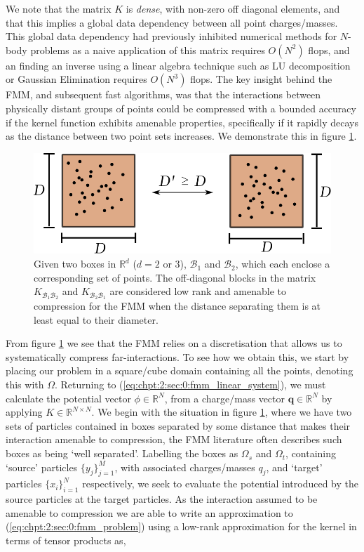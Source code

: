 We note that the matrix $K$ is \textit{dense}, with non-zero off diagonal elements, and that this implies a global data dependency between all point charges/masses. This global data dependency had previously inhibited numerical methods for $N$-body problems as a naive application of this matrix requires $O(N^2)$ flops, and an finding an inverse using a linear algebra technique such as LU decomposition or Gaussian Elimination requires $O(N^3)$ flops. The key insight behind the FMM, and subsequent fast algorithms, was that the interactions between physically distant groups of points could be compressed with a bounded accuracy if the kernel function exhibits amenable properties, specifically if it rapidly decays as the distance between two point sets increases. We demonstrate this in figure \ref{fig:chpt:2:sec:0:rank_decay}.

\begin{figure}[h]
    \centering
    \includegraphics[width=0.7\linewidth]{images/ch_2/low_rank.pdf}
    \caption{Given two boxes in $\mathbb{R}^d$ ($d=2$ or 3), $\mathcal{B}_1$ and $\mathcal{B}_2$, which each enclose a corresponding set of points. The off-diagonal blocks in the matrix $K_{\mathcal{B}_1\mathcal{B}_2}$ and $K_{\mathcal{B}_2\mathcal{B}_1}$ are considered low rank and amenable to compression for the FMM when the distance separating them is at least equal to their diameter.}
    \label{fig:chpt:2:sec:0:rank_decay}
\end{figure}

From figure \ref{fig:chpt:2:sec:0:rank_decay} we see that the FMM relies on a discretisation that allows us to systematically compress far-interactions. To see how we obtain this, we start by placing our problem in a square/cube domain containing all the points, denoting this with $\Omega$. Returning to (\ref{eq:chpt:2:sec:0:fmm_linear_system}), we must calculate the potential vector $\phi \in \mathbb{R}^N$, from a charge/mass vector $\mathbf{q} \in \mathbb{R}^N$ by applying $K \in \mathbb{R}^{N \times N} $. We begin with the situation in figure \ref{fig:chpt:2:sec:0:rank_decay}, where we have two sets of particles contained in boxes separated by some distance that makes their interaction amenable to compression, the FMM literature often describes such boxes as being `well separated'. Labelling the boxes as $\Omega_s$ and $\Omega_t$, containing `source' particles $\{y_j\}_{j=1}^M$, with associated charges/masses $q_j$, and `target' particles $\{x_i\}_{i=1}^N$ respectively, we seek to evaluate the potential introduced by the source particles at the target particles. As the interaction assumed to be amenable to compression we are able to write an approximation to (\ref{eq:chpt:2:sec:0:fmm_problem}) using a low-rank approximation for the kernel in terms of tensor products as,

